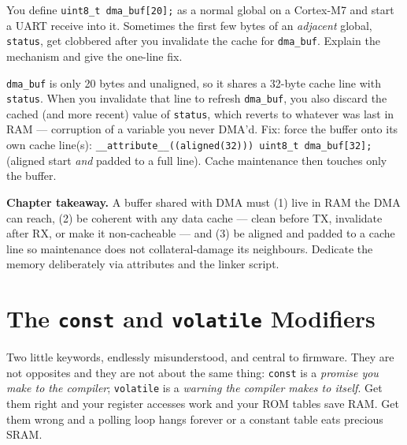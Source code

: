 \documentclass[11pt,a4paper,oneside]{book}
\newcommand{\code}[1]{\texttt{#1}}
\begin{document}
\begin{exercise}
You define \code{uint8\_t dma\_buf[20];} as a normal global on a Cortex-M7 and
start a UART receive into it. Sometimes the first few bytes of an
\emph{adjacent} global, \code{status}, get clobbered after you invalidate the
cache for \code{dma\_buf}. Explain the mechanism and give the one-line fix.
\end{exercise}
\begin{solution}
\code{dma\_buf} is only 20 bytes and unaligned, so it shares a 32-byte cache line
with \code{status}. When you invalidate that line to refresh \code{dma\_buf}, you
also discard the cached (and more recent) value of \code{status}, which reverts
to whatever was last in RAM --- corruption of a variable you never DMA'd. Fix:
force the buffer onto its own cache line(s):
\code{\_\_attribute\_\_((aligned(32))) uint8\_t dma\_buf[32];} (aligned start
\emph{and} padded to a full line). Cache maintenance then touches only the
buffer.
\end{solution}

\begin{keyidea}
\textbf{Chapter takeaway.} A buffer shared with DMA must (1) live in RAM the DMA
can reach, (2) be coherent with any data cache --- clean before TX, invalidate
after RX, or make it non-cacheable --- and (3) be aligned and padded to a cache
line so maintenance does not collateral-damage its neighbours. Dedicate the
memory deliberately via attributes and the linker script.
\end{keyidea}

\chapter{The \texttt{const} and \texttt{volatile} Modifiers}
\label{ch:constvol}

Two little keywords, endlessly misunderstood, and central to firmware. They are
not opposites and they are not about the same thing: \code{const} is a
\emph{promise you make to the compiler}; \code{volatile} is a \emph{warning the
compiler makes to itself}. Get them right and your register accesses work and
your ROM tables save RAM. Get them wrong and a polling loop hangs forever or a
constant table eats precious SRAM.
\end{document}
